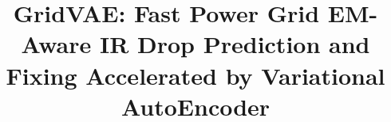 \documentclass[journal]{IEEEtran}
\begin{document}
\title{GridVAE: Fast Power Grid EM-Aware IR Drop Prediction and Fixing
  Accelerated by Variational AutoEncoder}



\maketitle
  
\begin{abstract}



\end{abstract}
\end{document}
